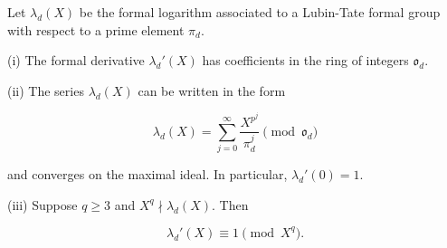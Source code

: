 Let $\lambda_d(X)$ be the formal logarithm associated to a Lubin-Tate formal group with respect to a prime element $\pi_d$.

(i) The formal derivative $\lambda_d'(X)$ has coefficients in the ring of integers $\mathfrak{o}_d$.

(ii) The series $\lambda_d(X)$ can be written in the form

$$\lambda_d(X) = \sum_{j=0}^{\infty} \frac{X^{p^j}}{\pi_d^j} \pmod{\mathfrak{o}_d}$$

and converges on the maximal ideal. In particular, $\lambda_d'(0) = 1$.

(iii) Suppose $q \geq 3$ and $X^q \nmid \lambda_d(X)$. Then

$$\lambda_d'(X) \equiv 1 \pmod{X^q}.$$
